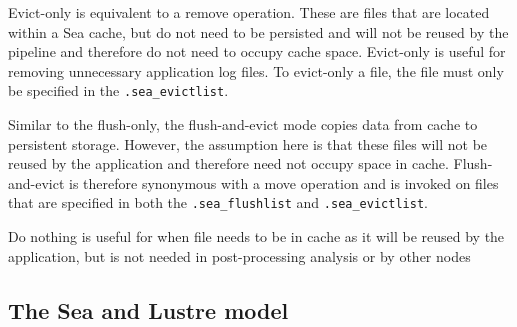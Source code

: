 Evict-only is equivalent to a remove operation. These are files that are located
within a Sea cache, but do not need to be persisted and will not be reused by
the pipeline and therefore do not need to occupy cache space. Evict-only is
useful for removing unnecessary application log files. To evict-only a file, the
file must only be specified in the \texttt{.sea\_evictlist}.

Similar to the flush-only, the flush-and-evict mode copies data from cache to
persistent storage. However, the assumption here is that these files will not be
reused by the application and therefore need not occupy space in cache.
Flush-and-evict is therefore synonymous with a move operation and is invoked on
files that are specified in both the \texttt{.sea\_flushlist} and
\texttt{.sea\_evictlist}.


Do nothing is useful for when file needs to be in cache as it will be reused by
the application, but is not needed in post-processing analysis or by other nodes


\subsection{The Sea and Lustre model}\label{ss:sea-comp:model}

